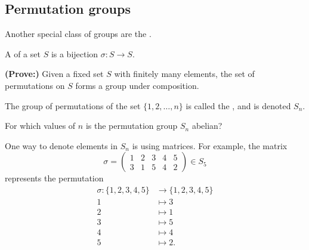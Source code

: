 \documentclass[../algebraNotesMSRI-UP2016.tex]{subfiles}
\begin{document}
\subsection[\subsecname]{Permutation groups}
\begin{frame}[c]{\subsecname}{}
Another special class of groups are the .

\smallGap
\begin{dfn}
A  of a set $S$ is a bijection $\sigma:S\to S$.
\end{dfn}

\smallGap
\begin{exe}\label{exe:permutations}
\textbf{(Prove:)} Given a fixed set $S$ with finitely many elements, the set of permutations on $S$ forms a group under composition.
\end{exe}
\end{frame}

\begin{frame}[c]
\begin{dfn}
The group of permutations of the set $\{1,2,\dots,n\}$ is called the , and is denoted $S_n$.
\end{dfn}

\smallGap
\begin{exe}\label{exe:permAbelian}
For which values of $n$ is the permutation group $S_n$ abelian?
\end{exe}
\end{frame}

\begin{frame}
\begin{ex}\label{ex:permMatrices1}
One way to denote elements in $S_n$ is using matrices.  For example, the matrix
\[
\sigma=\begin{pmatrix}
	1 & 2 & 3 & 4 & 5 \\
	3 & 1 & 5 & 4 & 2
	\end{pmatrix}\in S_5
\]
represents the permutation
\begin{align*}
\sigma:\{1,2,3,4,5\} &\to \{1,2,3,4,5\} \\
	1 &\mapsto 3 \\
	2 &\mapsto 1 \\
	3 &\mapsto 5 \\
	4 &\mapsto 4 \\
	5 &\mapsto 2.
\end{align*}
\end{ex}
\end{frame}
\end{document}
